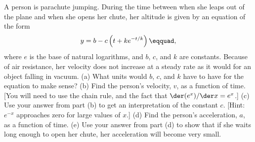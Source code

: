  A person is parachute jumping. During the
time between when she leaps out of the plane and when she
opens her chute, her altitude is given by an equation of the form
\begin{equation*}
      y = b - c\left(t+ke^{-t/k}\right)\eqquad,
\end{equation*}
where $e$ is the base of natural logarithms, and $b$, $c$, and
$k$ are constants. Because of air resistance, her velocity
does not increase at a steady rate as it would for an
object falling in vacuum.\hwendpart
(a) What units would $b$, $c$, and $k$ have to have for the
equation to make sense?\hwendpart
(b) Find the person's velocity, $v$, as a function of time.
[You will need to use the chain rule, and the fact that
$\der(e^x)/\der x=e^x$.] \answercheck\hwendpart
(c) Use your answer from part (b) to get an interpretation
of the constant $c$. [Hint: $e^{-x}$ approaches zero for
large values of $x$.]\hwendpart
(d) Find the person's acceleration, $a$, as a function of time.\answercheck\hwendpart
(e) Use your answer from part (d) to show that if she waits
long enough to open her chute, her acceleration will become very small.
